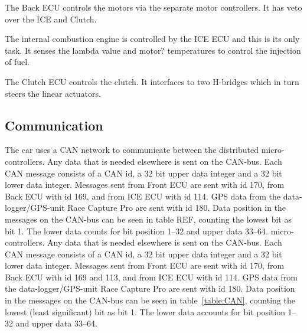 The Back ECU controls the motors via the separate motor controllers. It has
veto over the ICE and Clutch.

The internal combustion engine is controlled by the ICE ECU and this is its
only task. It senses the lambda value and motor? temperatures to control the
injection of fuel.

The Clutch ECU controls the clutch. It interfaces to two H-bridges which in turn
steers the linear actuators.  

\subsection{Communication}
The car uses a CAN network to communicate between the distributed
micro-controllers. Any data that is needed elsewhere is sent on the CAN-bus.
Each CAN message consists of a CAN id, a 32 bit upper data integer and a 32 bit
lower data integer. Messages sent from Front ECU are sent with id 170, from
Back ECU with id 169, and from ICE ECU with id 114. GPS data from the
data-logger/GPS-unit Race Capture Pro are sent with id 180. Data position in
the messages on the CAN-bus can be seen in table REF, counting the lowest bit
as bit 1. The lower data counts for bit position 1--32 and upper data 33--64.
micro-controllers. Any data that is needed elsewhere is sent on the CAN-bus.
Each CAN message consists of a CAN id, a 32 bit upper data integer and a 32 bit
lower data integer. Messages sent from Front ECU are sent with id 170, from Back
ECU with id 169 and 113, and from ICE ECU with id 114. GPS data from the
data-logger/GPS-unit Race Capture Pro are sent with id 180. Data position in the
messages on the CAN-bus can be seen in table~\ref{table:CAN}, counting the
lowest (least significant) bit as bit 1. The lower data accounts for bit
position 1--32 and upper data 33--64.

